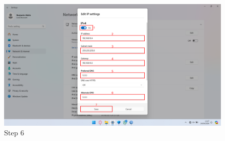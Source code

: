 \begin{center}
\begin{enumerate}
		\begin{figure}[H]
			\centering
			\includegraphics[width=0.9\linewidth]{P1/img/per3/pc1/Step 6.png}
			\caption{Step 6}
			\label{fig:Step 6(Per.3 PC1)}
		\end{figure}
	\end{enumerate}


\end{center}

